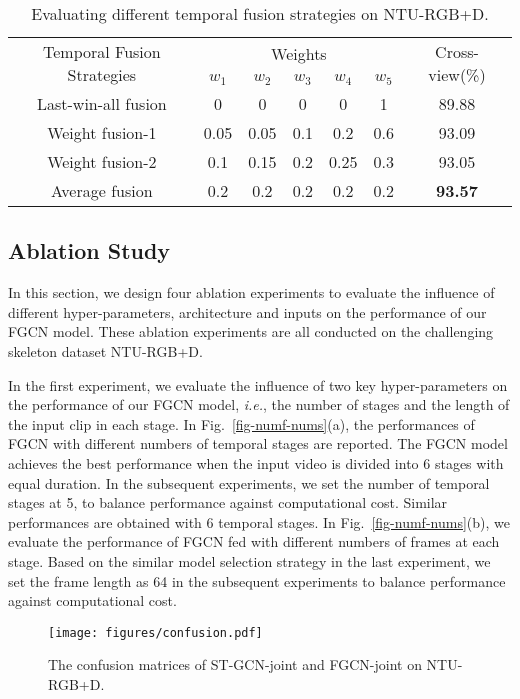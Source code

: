 \documentclass[runningheads]{llncs}
\begin{document}
\begin{table}[ht]
\caption{ Evaluating different temporal fusion strategies on NTU-RGB+D.}
	\label{tab-temporal-fusion}
	\tabcolsep=6pt
	\centering
	\begin{tabular}{ccccccc}
		\hline
		\multirow{2}{*}{Temporal Fusion Strategies} &  \multicolumn{5}{c}{ Weights } &\multirow{2}{*}{Cross-view(\%)} \\
		\cline{2-6}
		& $w_1$ & $w_2$ & $w_3$ & $w_4$ &  $w_5$ & \\
		\hline		
		Last-win-all fusion &0&0&0&0&1&89.88 \\
		Weight fusion-1 &0.05&0.05&0.1&0.2&0.6&93.09 \\
		Weight fusion-2 &0.1&0.15&0.2&0.25&0.3&93.05 \\
		Average fusion &0.2&0.2&0.2&0.2&0.2&\textbf{93.57} \\
		\hline
	\end{tabular}
\end{table}

\vspace{-1mm}
\subsection{Ablation Study}
In this section, we design four ablation experiments to evaluate the influence of different hyper-parameters, architecture and inputs on the performance of our FGCN model. These ablation experiments are all conducted on the challenging skeleton dataset NTU-RGB+D.

In the first experiment, we evaluate the influence of two key hyper-parameters on the performance of our FGCN model, \textit{i.e.}, the number of stages and the length of the input clip in each stage. In Fig.~\ref{fig-numf-nums}(a), the performances of FGCN with different numbers of temporal stages are reported. The FGCN model achieves the best performance when the input video is divided into 6 stages with equal duration. In the subsequent experiments, we set the number of temporal stages at 5, to balance performance against computational cost. Similar performances are obtained with 6 temporal stages. In Fig.~\ref{fig-numf-nums}(b), we evaluate the performance of FGCN fed with different numbers of frames at each stage. Based on the similar model selection strategy in the last experiment, we set the frame length as 64 in the subsequent experiments to balance performance against computational cost.

\begin{figure}[ht]
	\centering
	\texttt{[image: figures/confusion.pdf]}
	\caption{The confusion matrices of ST-GCN-joint and FGCN-joint on NTU-RGB+D.}
	\vspace{-4mm}
	\label{fig-confusion}
\end{figure}
\end{document}
